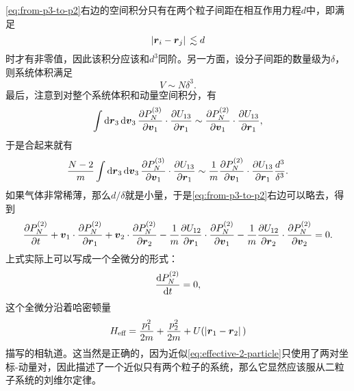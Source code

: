 \documentclass[hyperref, UTF8, a4paper]{ctexart}
\begin{document}
\eqref{eq:from-p3-to-p2}右边的空间积分只有在两个粒子间距在相互作用力程$d$中，即满足
\[
    \abs*{\vb*{r}_i - \vb*{r}_j} \lesssim d
\]
时才有非零值，因此该积分应该和$d^3$同阶。另一方面，设分子间距的数量级为$\delta$，则系统体积满足
\[
    V \sim N \delta^3.
\]
最后，注意到对整个系统体积和动量空间积分，有
\[
    \int \dd{\vb*{r}_3} \dd{\vb*{v}_3} \pdv{P_N^{(3)}}{\vb*{v}_1} \cdot \pdv{U_{13}}{\vb*{r}_1} \sim \pdv{P_N^{(2)}}{\vb*{v}_1} \cdot \pdv{U_{13}}{\vb*{r}_1},
\]
于是合起来就有
\[
    \frac{N-2}{m} \int \dd{\vb*{r}_3} \dd{\vb*{v}_3} \pdv{P_N^{(3)}}{\vb*{v}_1} \cdot \pdv{U_{13}}{\vb*{r}_1} \sim \frac{1}{m} \pdv{P_N^{(2)}}{\vb*{v}_1} \cdot \pdv{U_{13}}{\vb*{r}_1} \frac{d^3}{\delta^3}.
\]
如果气体非常稀薄，那么$d/\delta$就是小量，于是\eqref{eq:from-p3-to-p2}右边可以略去，得到
\begin{equation}
    \pdv{P_N^{(2)}}{t} 
    + \vb*{v}_1 \cdot \pdv{P_N^{(2)}}{\vb*{r}_1} 
    + \vb*{v}_2 \cdot \pdv{P_N^{(2)}}{\vb*{r}_2} 
    - \frac{1}{m} \pdv{U_{12}}{\vb*{r}_1} \cdot \pdv{P_N^{(2)}}{\vb*{v}_1} 
    - \frac{1}{m} \pdv{U_{12}}{\vb*{r}_2} \cdot \pdv{P_N^{(2)}}{\vb*{v}_2} = 0.
    \label{eq:effective-2-particle}
\end{equation}
上式实际上可以写成一个全微分的形式：
\[
    \dv{P_N^{(2)}}{t}=0,
\]
这个全微分沿着哈密顿量
\begin{equation}
    H_\text{eff} = \frac{p_1^2}{2m} + \frac{p_2^2}{2m} + U(\abs*{\vb*{r}_1 - \vb*{r}_2})
    \label{eq:2-particle-hamiltonian}
\end{equation}
描写的相轨道。这当然是正确的，因为近似\eqref{eq:effective-2-particle}只使用了两对坐标-动量对，因此描述了一个近似只有两个粒子的系统，那么它显然应该服从二粒子系统的刘维尔定律。
\end{document}
